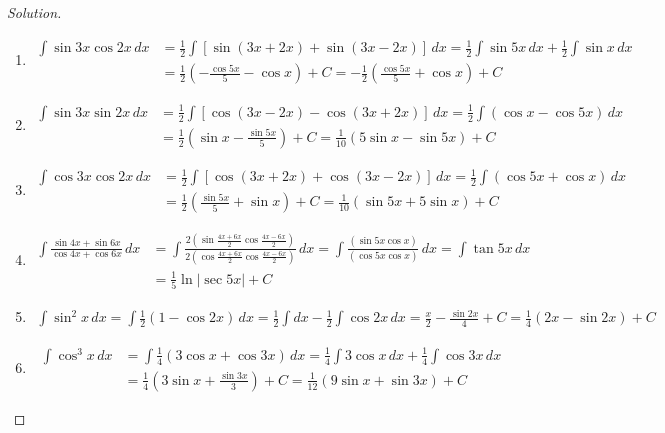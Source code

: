 \documentclass{book}
\theoremstyle{definition}
\newenvironment{solution}
    {\begin{proof}[Solution]}
    {\end{proof}}
\begin{document}
\begin{solution}
\begin{enumerate}[label=(\roman*)]
\item 
\begin{align*}
    \displaystyle\int \sin 3x\cos 2x \, dx &= \frac{1}{2}\displaystyle\int \left[\sin(3x+2x)+\sin(3x-2x)\right] \, dx = \frac{1}{2}\displaystyle\int\sin 5x \,dx+\frac{1}{2}\int\sin x \, dx \\
    &= \frac{1}{2}\left(-\frac{\cos 5x}{5}-\cos x\right)+C = -\frac{1}{2}\left(\frac{\cos 5x}{5}+\cos x\right)+C
\end{align*}

\item 
\begin{align*}
    \displaystyle\int \sin 3x\sin 2x \, dx  &= \frac{1}{2}\displaystyle\int [\cos(3x-2x)-\cos (3x+2x)] \, dx = \frac{1}{2}\displaystyle\int (\cos x-\cos 5x)\, dx \\ 
    &= \frac{1}{2} \left(\sin x-\frac{\sin 5x}{5}\right)+C =\frac{1}{10} (5\sin x-\sin 5x)+C
\end{align*}

\item 
\begin{align*}
    \displaystyle\int \cos 3x\cos 2x \, dx  &= \frac{1}{2}\displaystyle\int [\cos(3x+2x)+\cos (3x-2x)] \, dx=\frac{1}{2}\displaystyle\int (\cos 5x+\cos x)\, dx \\
    &= \frac{1}{2} (\frac{\sin 5x}{5}+\sin x)+C =\frac{1}{10} (\sin 5x+5\sin x)+C
\end{align*}

\item 
\begin{align*}
    \displaystyle\int \frac{\sin 4x+\sin 6x}{\cos 4x+\cos 6x} \, dx &= \displaystyle\int \frac{2(\sin\frac{4x+6x}{2}\cos\frac{4x-6x}{2})}{2(\cos\frac{4x+6x}{2}\cos\frac{4x-6x}{2})} \, dx = \int \frac{(\sin 5x\cos x)}{(\cos 5x\cos x)}\, dx = \int \tan 5x\,dx \\
    &= \frac{1}{5} \ln|\sec 5x|+C
\end{align*}

\item 
\begin{align*}
\int\sin^2x\, dx = \int\frac{1}{2}(1-\cos 2x)\, dx = \frac {1}{2}\int dx-\frac{1}{2}\int \cos 2x\,dx = \frac{x}{2}-\frac{\sin 2x}{4}+C = \frac{1}{4}(2x-\sin 2x)+C
\end{align*}

\item
\begin{align*}
    \int\cos^3x \, dx &= \int\frac{1}{4}(3\cos x+\cos 3x) \, dx = \frac{1}{4}\int 3\cos x\,dx+\frac{1}{4}\int \cos 3x\,dx \\
 &= \frac{1}{4}\left(3\sin x+\frac{\sin 3x}{3}\right)+C=\frac{1}{12}(9\sin x+\sin 3x)+C
\end{align*}



\end{enumerate}
\end{solution}
\end{document}
